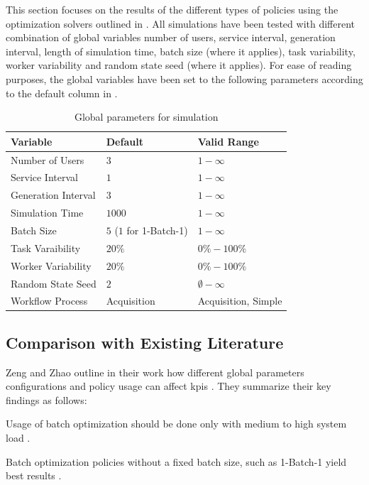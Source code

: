 \documentclass{seal_thesis}
\begin{document}
This section focuses on the results of the different types of policies using the optimization solvers outlined in . All simulations have been tested with different combination of global variables \ie number of users, service interval, generation interval, length of simulation time, batch size (where it applies), task variability, worker variability and random state seed (where it applies). For ease of reading purposes, the global variables have been set to the following parameters according to the default column in .

\begin{table}[!ht]
\centering
\begin{tabular}{@{}lll@{}}
\toprule
Variable            & Default     & Valid Range \\ \midrule
Number of Users     & $3$           & $1-\infty$      \\
Service Interval    & $1$           & $1-\infty$      \\
Generation Interval & $3$           & $1-\infty$      \\
Simulation Time     & $1000$          & $1-\infty$      \\
Batch Size          & $5$ ($1$ for 1-Batch-1)           & $1-\infty$      \\
Task Varaibility    & $20\%$        & $0\%-100\%$      \\
Worker Variability  & $20\%$        & $0\%-100\%$      \\
Random State Seed   & $2$           & $\emptyset-\infty$      \\
Workflow Process    & Acquisition & Acquisition, Simple      \\ \bottomrule
\end{tabular}
\caption{Global parameters for simulation}
\label{tab:global_parameters_sim}
\end{table}

\subsection{Comparison with Existing Literature}
\label{subsec:opt_comparison}

Zeng and Zhao outline in their work how different global parameters configurations and policy usage can affect \glspl{kpi} \cite[pp. 18-22]{Zeng2005}. They summarize their key findings as follows:
\begin{enumerate*}
	\item Usage of batch optimization should be done only with medium to high system load \cite[p. 24]{Zeng2005}.
	\item Batch optimization policies without a fixed batch size, such as 1-Batch-1 yield best results \cite[p. 24]{Zeng2005}.
\end{enumerate*}
\end{document}
